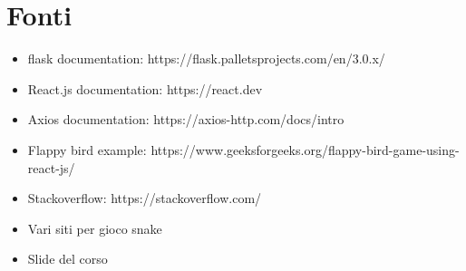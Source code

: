 \documentclass{article}
\begin{document}
\section{Fonti}
\begin{itemize}
    \item flask documentation: https://flask.palletsprojects.com/en/3.0.x/
    \item React.js documentation: https://react.dev
    \item Axios documentation: https://axios-http.com/docs/intro
    \item Flappy bird example: https://www.geeksforgeeks.org/flappy-bird-game-using-react-js/
    \item Stackoverflow: https://stackoverflow.com/
    \item Vari siti per gioco snake
    \item Slide del corso
\end{itemize}
\end{document}

